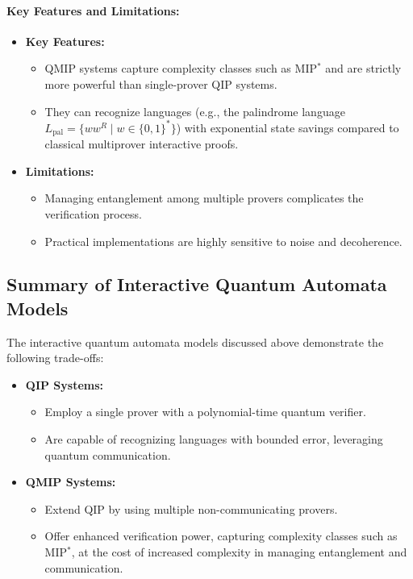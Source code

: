 \paragraph{Key Features and Limitations:}
\begin{itemize}
    \item \textbf{Key Features:}
    \begin{itemize}
        \item QMIP systems capture complexity classes such as MIP\(^*\) and are strictly more powerful than single-prover QIP systems.
        \item They can recognize languages (e.g., the palindrome language \( L_{\text{pal}} = \{ww^R \mid w \in \{0,1\}^*\} \)) with exponential state savings compared to classical multiprover interactive proofs.
    \end{itemize}
    \item \textbf{Limitations:}
    \begin{itemize}
        \item Managing entanglement among multiple provers complicates the verification process.
        \item Practical implementations are highly sensitive to noise and decoherence.
    \end{itemize}
\end{itemize}

\subsection*{Summary of Interactive Quantum Automata Models}
The interactive quantum automata models discussed above demonstrate the following trade-offs:
\begin{itemize}
    \item \textbf{QIP Systems:}  
    \begin{itemize}
        \item Employ a single prover with a polynomial-time quantum verifier.
        \item Are capable of recognizing languages with bounded error, leveraging quantum communication.
    \end{itemize}
    \item \textbf{QMIP Systems:}  
    \begin{itemize}
        \item Extend QIP by using multiple non-communicating provers.
        \item Offer enhanced verification power, capturing complexity classes such as MIP\(^*\), at the cost of increased complexity in managing entanglement and communication.
    \end{itemize}
\end{itemize}

